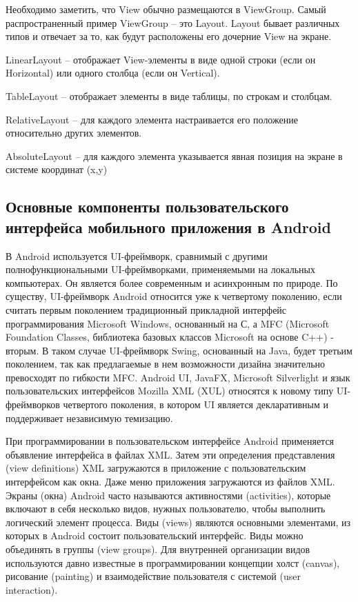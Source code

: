 Необходимо заметить, что View обычно размещаются в ViewGroup. Самый распространенный пример ViewGroup – это Layout. Layout бывает различных типов и отвечает за то, как будут расположены его дочерние View на экране.

LinearLayout – отображает View-элементы в виде одной строки (если он Horizontal) или одного столбца (если он Vertical).

TableLayout – отображает элементы в виде таблицы, по строкам и столбцам.

RelativeLayout – для каждого элемента настраивается его положение относительно других элементов.

AbsoluteLayout – для каждого элемента указывается явная позиция на экране в системе координат (x,y)

\subsection{Основные компоненты пользовательского интерфейса мобильного приложения в Android}

В Android используется UI-фреймворк, сравнимый с другими полнофункциональными UI-фреймворками, применяемыми на локальных компьютерах. Он является более современным и асинхронным по природе. По существу, UI-фреймворк Android относится уже к четвертому поколению, если считать первым поколением традиционный прикладной интерфейс программирования Microsoft Windows, основанный на С, а MFC (Microsoft Foundation Classes, библиотека базовых классов Microsoft на основе C++) - вторым. В таком случае UI-фреймворк Swing, основанный на Java, будет третьим поколением, так как предлагаемые в нем возможности дизайна значительно превосходят по гибкости MFC. Android UI, JavaFX, Microsoft Silverlight и язык пользовательских интерфейсов Mozilla XML (XUL) относятся к новому типу UI-фреймворков четвертого поколения, в котором UI является декларативным и поддерживает независимую темизацию.

При программировании в пользовательском интерфейсе Android применяется объявление интерфейса в файлах XML. Затем эти определения представления (view definitions) XML загружаются в приложение с пользовательским интерфейсом как окна. Даже меню приложения загружаются из файлов XML. Экраны (окна) Android часто называются активностями (activities), которые включают в себя несколько видов, нужных пользователю, чтобы выполнить логический элемент процесса. Виды (views) являются основными элементами, из которых в Android состоит пользовательский интерфейс. Виды можно объединять в группы (view groups). Для внутренней организации видов используются давно известные в программировании концепции холст (canvas), рисование (painting) и взаимодействие пользователя с системой (user interaction).

